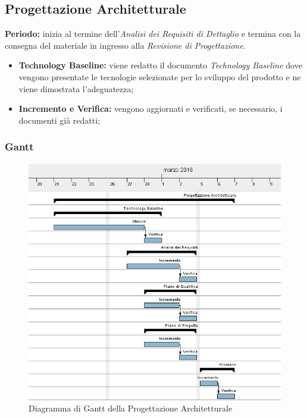 \subsection{Progettazione Architetturale}
    \textbf{Periodo:}
    inizia al termine dell'\emph{Analisi dei Requisiti di Dettaglio} e termina con la consegna del materiale in ingresso alla \emph{Revisione di Progettazione}.
    \begin{itemize}
    	\item \textbf{Technology Baseline:} viene redatto il documento \emph{Technology Baseline} dove vengono presentate le tecnologie selezionate per lo sviluppo del prodotto e ne viene dimostrata l'adeguatezza;
    	\item \textbf{Incremento e Verifica:} vengono aggiornati e verificati, se necessario, i documenti già redatti;
    \end{itemize}
\subsubsection{Gantt}
\begin{figure}[H]
	\centering 
	\includegraphics[width=1\textwidth]{images/Progettazione-Architetturale.png}
	\caption{Diagramma di Gantt della Progettazione Architetturale}
	\label{graficobello3} 
\end{figure}
